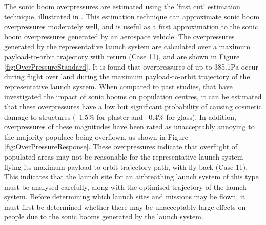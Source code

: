 The sonic boom overpressures are estimated using the 'first cut' estimation technique, illustrated in \cite{Carlson1972}. This estimation technique can approximate sonic boom overpressures moderately well, and is useful as a first approximation to the sonic boom overpressures generated by an aerospace vehicle. The overpressures generated by the representative launch system are calculated over a maximum payload-to-orbit trajectory with return (Case 11), and are shown in Figure \ref{fig:OverPressureStandard}. It is found that overpressures of up to 385.1Pa occur during flight over land during the maximum payload-to-orbit trajectory of the representative launch system. When compared to past studies, that have investigated the impact of sonic booms on population centres, it can be estimated that these overpressures have a low but significant probability of causing cosmetic damage to structures (~1.5\% for plaster and ~0.4\% for glass)\cite{Hershey1976}. In addition, overpressures of these magnitudes have been rated as unacceptably annoying to the majority populace being overflown, as shown in Figure \ref{fig:OverPressureResponse}. 
These overpressures indicate that overflight of populated areas may not be reasonable for the representative launch system flying its maximum payload-to-orbit trajectory path, with fly-back (Case 11). This indicates that the launch site for an airbreathing launch system of this type must be analysed carefully, along with the optimised trajectory of the launch system. Before determining which launch sites and missions may be flown, it must first be determined whether there may be unacceptably large effects on people due to the sonic booms generated by the launch system.

\FloatBarrier
